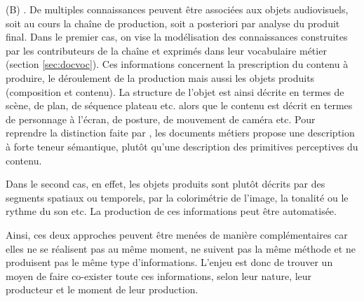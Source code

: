 \begin{liste}
	\item[(B)] .
	De multiples connaissances peuvent être associées aux objets audiovisuels, soit au cours la chaîne de production, soit a posteriori par analyse du produit final.
	Dans le premier cas, on vise la modélisation des connaissances construites par les contributeurs de la chaîne et exprimés dans leur vocabulaire métier (section \ref{sec:docvoc}). 
	Ces informations concernent la prescription du contenu à produire, le déroulement de la production mais aussi les objets produits (composition et contenu).
	La structure de l'objet est ainsi décrite en termes de scène, de plan, de séquence plateau etc. alors que le contenu est décrit en termes de personnage à l'écran, de posture, de mouvement de caméra etc. 
	Pour reprendre la distinction faite par \cite[\S 3.3.2.1 Descriptions du contenu, p.83]{ThiBui2003}, les documents métiers propose une description à forte teneur sémantique, plutôt qu'une description des primitives perceptives du contenu.
	
	Dans le second cas, en effet, les objets produits sont plutôt décrits par des segments spatiaux ou temporels, par la colorimétrie de l'image, la tonalité ou le rythme du son etc. 
	La production de ces informations peut être automatisée. 
	
	Ainsi, ces deux approches peuvent être menées de manière complémentaires car elles ne se réalisent pas au même moment, ne suivent pas la même méthode et ne produisent pas le même type d'informations.
	L'enjeu est donc de trouver un moyen de faire co-exister toute ces informations, selon leur nature, leur producteur et le moment de leur production.
\end{liste}



